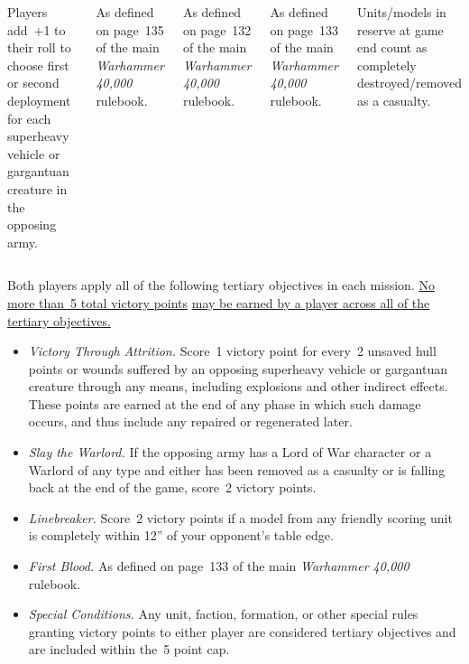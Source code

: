 \begin{columns}
  Players add~+1 to their roll to
choose first or second deployment for each superheavy vehicle or
gargantuan creature in the opposing army.

 As defined on page~135 of the main
\emph{Warhammer 40,000} rulebook.

 As defined on page~132 of
the main \emph{Warhammer 40,000} rulebook.

 As defined on page~133 of
the main \emph{Warhammer 40,000} rulebook.

  Units/models in reserve at game end count
as completely destroyed/removed as a casualty.

\end{columns}


Both players apply all of the following tertiary objectives in each
mission.  \underline{No more than~5 total victory points}
\underline{may be earned by a player across all of the tertiary
  objectives.}

\begin{itemize}
\item \textit{Victory Through Attrition.}  Score~1 victory point for
  every~2 unsaved hull points or wounds suffered by an opposing
  superheavy vehicle or gargantuan creature through any means,
  including explosions and other indirect effects.  These points are
  earned at the end of any phase in which such damage occurs, and thus
  include any repaired or regenerated later.

\item \textit{Slay the Warlord.}  If the opposing army has a Lord of
  War character or a Warlord of any type and either has been removed
  as a casualty or is falling back at the end of the game, score~2
  victory points.

\item \textit{Linebreaker.}  Score~2 victory points if a model from
  any friendly scoring unit is completely within 12'' of your
  opponent's table edge.

\item \textit{First Blood.}  As defined on page~133 of the main
  \emph{Warhammer 40,000} rulebook.

\item \textit{Special Conditions.}  Any unit, faction, formation, or
  other special rules granting victory points to either player are
  considered tertiary objectives and are included within the~5 point
  cap.
\end{itemize}
